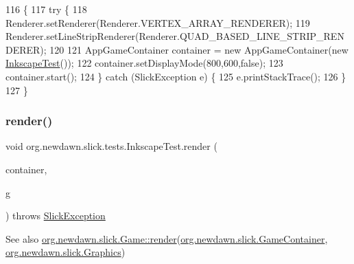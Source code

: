 \begin{DoxyCode}
116                                            \{
117         \textcolor{keywordflow}{try} \{
118             Renderer.setRenderer(Renderer.VERTEX\_ARRAY\_RENDERER);
119             Renderer.setLineStripRenderer(Renderer.QUAD\_BASED\_LINE\_STRIP\_RENDERER);
120             
121             AppGameContainer container = \textcolor{keyword}{new} AppGameContainer(\textcolor{keyword}{new} \mbox{\hyperlink{classorg_1_1newdawn_1_1slick_1_1tests_1_1_inkscape_test_af8c8454a56a3690c18456a069a166a90}{InkscapeTest}}());
122             container.setDisplayMode(800,600,\textcolor{keyword}{false});
123             container.start();
124         \} \textcolor{keywordflow}{catch} (SlickException e) \{
125             e.printStackTrace();
126         \}
127     \}
\end{DoxyCode}
\mbox{\label{classorg_1_1newdawn_1_1slick_1_1tests_1_1_inkscape_test_a76a9b74eff0ae959f572bc67c2f13124}} 
\subsubsection{\texorpdfstring{render()}{render()}}
{\footnotesize\ttfamily void org.\+newdawn.\+slick.\+tests.\+Inkscape\+Test.\+render (\begin{DoxyParamCaption}\item[{\mbox{\hyperlink{classorg_1_1newdawn_1_1slick_1_1_game_container}{Game\+Container}}}]{container,  }\item[{\mbox{\hyperlink{classorg_1_1newdawn_1_1slick_1_1_graphics}{Graphics}}}]{g }\end{DoxyParamCaption}) throws \mbox{\hyperlink{classorg_1_1newdawn_1_1slick_1_1_slick_exception}{Slick\+Exception}}\hspace{0.3cm}{\ttfamily [inline]}}

\begin{DoxySeeAlso}{See also}
\mbox{\hyperlink{interfaceorg_1_1newdawn_1_1slick_1_1_game_af1a4670d43eb3ba04dfcf55ab1975b64}{org.\+newdawn.\+slick.\+Game\+::render}}(\mbox{\hyperlink{classorg_1_1newdawn_1_1slick_1_1_game_container}{org.\+newdawn.\+slick.\+Game\+Container}}, \mbox{\hyperlink{classorg_1_1newdawn_1_1slick_1_1_graphics}{org.\+newdawn.\+slick.\+Graphics}}) 
\end{DoxySeeAlso}


